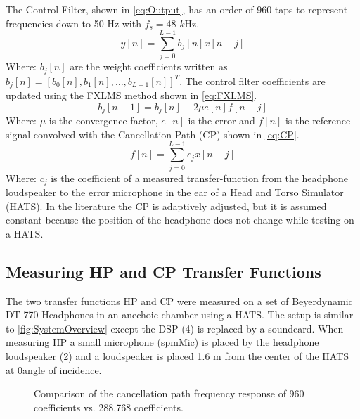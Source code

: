 The Control Filter, shown in \autoref{eq:Output}, has an order of 960 taps to represent frequencies down to 50 Hz with $f_s = 48$ $k$Hz. 
\begin{equation}\label{eq:Output}
y[n]=\sum_{j=0}^{L-1}b_j[n]x[n-j]
\end{equation}
Where: $b_j[n]$ are the weight coefficients written as  $b_j[n]=[b_0[n],b_1[n], \dotsc, b_{L-1}[n]]^T$. The control filter coefficients are updated using the FXLMS method shown in \autoref{eq:FXLMS}.
\begin{equation}\label{eq:FXLMS}
b_j[n+1] = b_j[n] - 2\mu e[n]f[n-j]
\end{equation}
Where: $\mu$ is the convergence factor, $e[n]$ is the error and $f[n]$ is the reference signal convolved with the Cancellation Path (CP) shown in \autoref{eq:CP}.
\begin{equation}\label{eq:CP}
f[n]=\sum_{j=0}^{L-1}c_jx[n-j]
\end{equation}
Where: $c_j$ is the coefficient of a measured transfer-function from the headphone loudspeaker to the error microphone in the ear of a Head and Torso Simulator (HATS). In the literature \cite{Hansen} the CP is adaptively adjusted, but it is assumed constant because the position of the headphone does not change while testing on a HATS. 


\subsection{Measuring HP and CP Transfer Functions}
The two transfer functions HP and CP were measured on a set of Beyerdynamic DT 770 Headphones in an anechoic chamber using a HATS. The setup is similar to \autoref{fig:SystemOverview} except the DSP (4) is replaced by a soundcard. When measuring HP a small microphone (spmMic) is placed by the headphone loudspeaker (2) and a loudspeaker is placed 1.6 m from the center of the HATS at 0\textdegree angle of incidence.  

\begin{figure}[H]
	\centering
	
	\caption{Comparison of the cancellation path frequency response of 960 coefficients vs. 288,768 coefficients.}
	\label{CancellationPathImpulseResponseCompare}
\end{figure}
   
